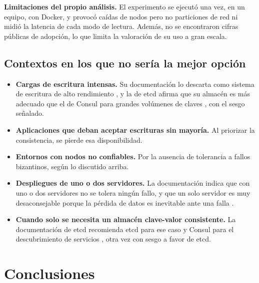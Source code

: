 \documentclass[12pt,a4paper]{article}
\begin{document}
\textbf{Limitaciones del propio análisis.} El experimento se ejecutó una vez, en un equipo, con
Docker, y provocó caídas de nodos pero no particiones de red ni midió la latencia de cada modo
de lectura. Además, no se encontraron cifras públicas de adopción, lo que limita la valoración
de su uso a gran escala.

\subsection{Contextos en los que no sería la mejor opción}

\begin{itemize}
  \item \textbf{Cargas de escritura intensas.} Su documentación lo descarta como sistema de
  escritura de alto rendimiento \cite{consul_consensus}, y la de etcd afirma que su
  almacén es más adecuado que el de Consul para grandes volúmenes de claves
  \cite{etcd_why}, con el sesgo señalado.
  \item \textbf{Aplicaciones que deban aceptar escrituras sin mayoría.} Al priorizar la
  consistencia, se pierde esa disponibilidad.
  \item \textbf{Entornos con nodos no confiables.} Por la ausencia de tolerancia a fallos
  bizantinos, según lo discutido arriba.
  \item \textbf{Despliegues de uno o dos servidores.} La documentación indica que con uno o dos
  servidores no se tolera ningún fallo, y que un solo servidor es muy desaconsejable porque la
  pérdida de datos es inevitable ante una falla \cite{consul_consensus}.
  \item \textbf{Cuando solo se necesita un almacén clave-valor consistente.} La documentación
  de etcd recomienda etcd para ese caso y Consul para el descubrimiento de servicios
  \cite{etcd_why}, otra vez con sesgo a favor de etcd.
\end{itemize}



\section{Conclusiones}
\end{document}
